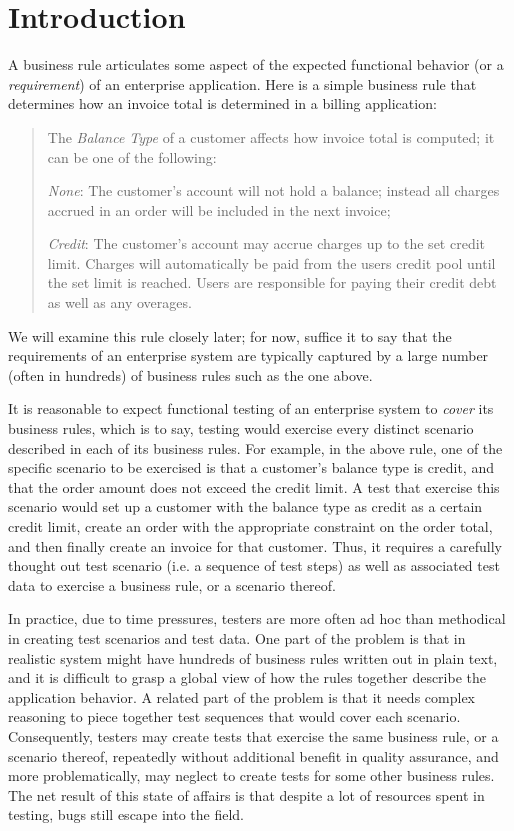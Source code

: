 \section{Introduction}

A business rule articulates some aspect of the expected functional behavior (or a \textit{requirement})
of an enterprise application. Here is a simple business rule that determines how an invoice total is 
determined in a billing application:

\begin{quote}
	The \textit{Balance Type} of a customer affects how invoice total is computed; it can be 
	one of the following:

	\textit{None}: The customer's account will not hold a balance; instead all charges accrued 
	in an order will be included in the next invoice;
	
	\textit{Credit}: The customer's account may accrue charges up to the set credit limit. 
	Charges will automatically be paid from the users credit pool until the set limit is reached. 
	Users are responsible for paying their credit debt as well as any overages.
\end{quote}	

We will examine this rule closely later; for now, suffice it to say that the requirements 
of an enterprise system are typically captured by a large number (often in hundreds) of business rules
such as the one above.

It is reasonable to expect functional testing of an enterprise system to \textit{cover} its 
business rules, which is to say, testing would exercise every distinct scenario described in each of
its business rules.  For example, in the above rule, one of the specific scenario to be exercised is
that a customer's balance type is credit, and that the order amount does not exceed the credit limit.
A test that exercise this scenario would set up a customer with the balance type as credit as a certain
credit limit, create an order with the appropriate constraint on the order total, and then finally
create an invoice for that customer.  Thus, it requires a carefully thought out test scenario (i.e. a
sequence of test steps) as well as associated test data to exercise a business rule, or a scenario thereof.

In practice, due to time pressures, testers are more often ad hoc than methodical in creating test 
scenarios and test data.  One part of the problem is that in realistic system might have hundreds of 
business rules written out in plain text, and it is difficult to grasp a global view of how the rules 
together describe the application behavior.  A related part of the problem is that it needs complex 
reasoning to piece together test sequences that would cover each scenario. Consequently, testers may 
create tests that exercise the same business rule, or a scenario thereof, repeatedly without additional 
benefit in quality assurance, and more problematically, may neglect to create tests for some other business 
rules.  The net result of this state of affairs is that despite a lot of resources spent in testing, bugs 
still escape into the field.

